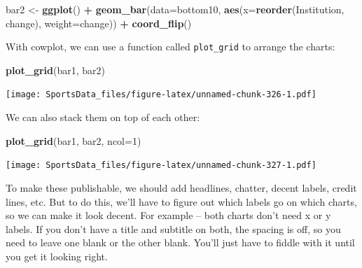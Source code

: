 \documentclass[]{book}
\newenvironment{Shaded}{\begin{snugshade}}{\end{snugshade}}
\newcommand{\DataTypeTok}[1]{\textcolor[rgb]{0.13,0.29,0.53}{#1}}
\newcommand{\DecValTok}[1]{\textcolor[rgb]{0.00,0.00,0.81}{#1}}
\newcommand{\KeywordTok}[1]{\textcolor[rgb]{0.13,0.29,0.53}{\textbf{#1}}}
\newcommand{\NormalTok}[1]{#1}
\newcommand{\OperatorTok}[1]{\textcolor[rgb]{0.81,0.36,0.00}{\textbf{#1}}}
\newcommand{\StringTok}[1]{\textcolor[rgb]{0.31,0.60,0.02}{#1}}
\begin{document}
\begin{Shaded}
\begin{Highlighting}[]
\NormalTok{bar2 <-}\StringTok{ }\KeywordTok{ggplot}\NormalTok{() }\OperatorTok{+}\StringTok{ }\KeywordTok{geom_bar}\NormalTok{(}\DataTypeTok{data=}\NormalTok{bottom10, }\KeywordTok{aes}\NormalTok{(}\DataTypeTok{x=}\KeywordTok{reorder}\NormalTok{(Institution, change), }\DataTypeTok{weight=}\NormalTok{change)) }\OperatorTok{+}\StringTok{ }\KeywordTok{coord_flip}\NormalTok{()}
\end{Highlighting}
\end{Shaded}

With cowplot, we can use a function called \texttt{plot\_grid} to arrange the charts:

\begin{Shaded}
\begin{Highlighting}[]
\KeywordTok{plot_grid}\NormalTok{(bar1, bar2) }
\end{Highlighting}
\end{Shaded}

\texttt{[image: SportsData\_files/figure-latex/unnamed-chunk-326-1.pdf]}

We can also stack them on top of each other:

\begin{Shaded}
\begin{Highlighting}[]
\KeywordTok{plot_grid}\NormalTok{(bar1, bar2, }\DataTypeTok{ncol=}\DecValTok{1}\NormalTok{) }
\end{Highlighting}
\end{Shaded}

\texttt{[image: SportsData\_files/figure-latex/unnamed-chunk-327-1.pdf]}

To make these publishable, we should add headlines, chatter, decent labels, credit lines, etc. But to do this, we'll have to figure out which labels go on which charts, so we can make it look decent. For example -- both charts don't need x or y labels. If you don't have a title and subtitle on both, the spacing is off, so you need to leave one blank or the other blank. You'll just have to fiddle with it until you get it looking right.
\end{document}
